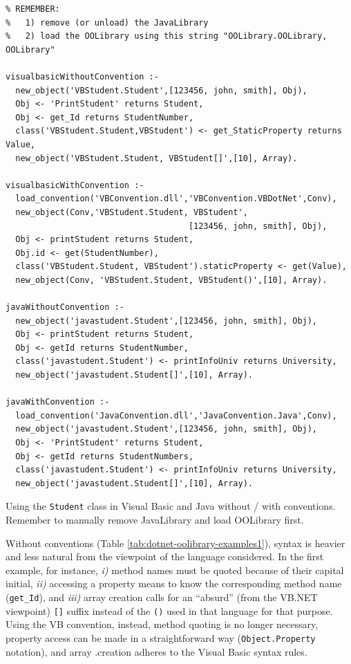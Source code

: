 \begin{table}
{\small
\begin{verbatim}
% REMEMBER:
%	1) remove (or unload) the JavaLibrary
%	2) load the OOLibrary using this string "OOLibrary.OOLibrary, OOLibrary"

visualbasicWithoutConvention :-
  new_object('VBStudent.Student',[123456, john, smith], Obj),
  Obj <- 'PrintStudent' returns Student,
  Obj <- get_Id returns StudentNumber,
  class('VBStudent.Student,VBStudent') <- get_StaticProperty returns Value,
  new_object('VBStudent.Student, VBStudent[]',[10], Array).

visualbasicWithConvention :-
  load_convention('VBConvention.dll','VBConvention.VBDotNet',Conv),
  new_object(Conv,'VBStudent.Student, VBStudent',
                                     [123456, john, smith], Obj),
  Obj <- printStudent returns Student,
  Obj.id <- get(StudentNumber),
  class('VBStudent.Student, VBStudent').staticProperty <- get(Value),
  new_object(Conv, 'VBStudent.Student, VBStudent()',[10], Array).

javaWithoutConvention :-
  new_object('javastudent.Student',[123456, john, smith], Obj),
  Obj <- printStudent returns Student,
  Obj <- getId returns StudentNumber,
  class('javastudent.Student') <- printInfoUniv returns University,
  new_object('javastudent.Student[]',[10], Array).

javaWithConvention :-
  load_convention('JavaConvention.dll','JavaConvention.Java',Conv),
  new_object('javastudent.Student',[123456, john, smith], Obj),
  Obj <- 'PrintStudent' returns Student,
  Obj <- getId returns StudentNumbers,
  class('javastudent.Student') <- printInfoUniv returns University,
  new_object('javastudent.Student[]',[10], Array).
\end{verbatim}
}
  \caption{Using the \texttt{Student} class in Visual Basic and Java without / with conventions. Remember to manually remove JavaLibrary and load OOLibrary first.}
  \label{tab:dotnet-oolibrary-examples1}
\end{table}

\noindent Without conventions (Table \ref{tab:dotnet-oolibrary-examples1}), syntax is heavier and less natural from the viewpoint of the language considered.
In the first example, for instance, \textit{i)} method names must be quoted because of their capital initial, \textit{ii)} accessing a property means to know the corresponding method name (\texttt{get\_Id}), and \textit{iii)} array creation calls for an ``absurd'' (from the VB.NET viewpoint) \texttt{[]} suffix instead of the \texttt{()} used in that language for that purpose.
Using the VB convention, instead, method quoting is no longer necessary, property access can be made in a straightforward way (\texttt{Object.Property} notation), and array .creation adheres to the Visual Basic syntax rules.


